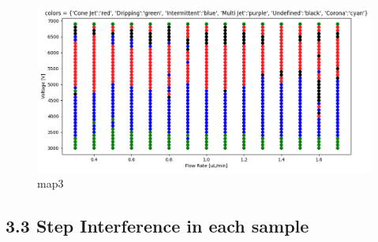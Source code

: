     \begin{figure}[H]
        \center
        \includegraphics[width=15cm]{images/map3.png}
        \caption{map3}
    \end{figure}






\subsection*{3.3 Step Interference in each sample}


